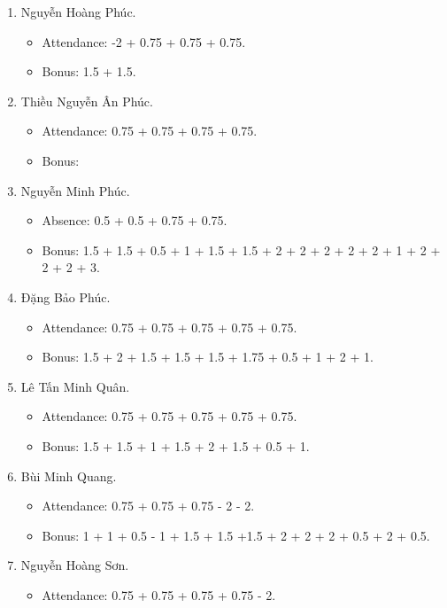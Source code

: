 \documentclass{article}
\begin{document}
\begin{enumerate}
\begin{itemize}
    \end{itemize}
    \item {\sc Nguyễn Hoàng Phúc.}
    \begin{itemize}
        \item Attendance: -2 + 0.75 + 0.75 + 0.75.
        \item Bonus: 1.5 + 1.5.
    \end{itemize}
    \item {\sc Thiều Nguyễn Ân Phúc.}
    \begin{itemize}
        \item Attendance: 0.75 + 0.75 + 0.75 + 0.75.
        \item Bonus:
    \end{itemize}
    \item {\sc Nguyễn Minh Phúc.}
    \begin{itemize}
        \item Absence: 0.5 + 0.5 + 0.75 + 0.75.
        \item Bonus: 1.5 + 1.5 + 0.5 + 1 + 1.5 + 1.5 + 2 + 2 + 2 + 2 + 2 + 1 + 2 + 2 + 2 + 3.
    \end{itemize}
    \item {\sc Đặng Bảo Phúc.}
    \begin{itemize}
        \item Attendance: 0.75 + 0.75 + 0.75 + 0.75 + 0.75.
        \item Bonus: 1.5 + 2 + 1.5 + 1.5 + 1.5 + 1.75 + 0.5 + 1 + 2 + 1.
    \end{itemize}
    \item {\sc Lê Tấn Minh Quân.}
    \begin{itemize}
        \item Attendance: 0.75 + 0.75 + 0.75 + 0.75 + 0.75.
        \item Bonus: 1.5 + 1.5 + 1 + 1.5 + 2 + 1.5 + 0.5 + 1.
    \end{itemize}
    \item {\sc Bùi Minh Quang.}
    \begin{itemize}
        \item Attendance: 0.75 + 0.75 + 0.75 - 2 - 2.
        \item Bonus: 1 + 1 + 0.5 - 1 + 1.5 + 1.5 +1.5 + 2 + 2 + 2 + 0.5 + 2 + 0.5.
    \end{itemize}
    \item {\sc Nguyễn Hoàng Sơn.}
    \begin{itemize}
        \item Attendance: 0.75 + 0.75 + 0.75 + 0.75 - 2.

\end{itemize}
\end{enumerate}
\end{document}

